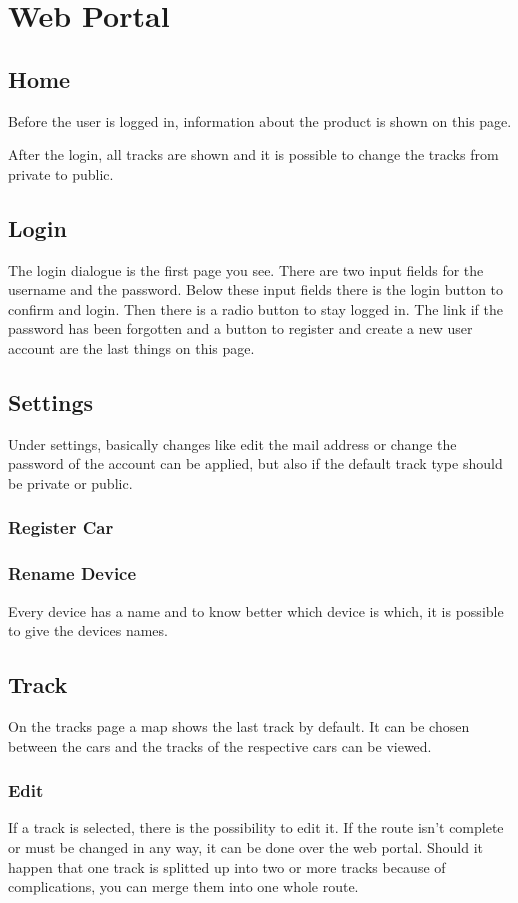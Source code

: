 \section{Web Portal}
\subsection{Home}
Before the user is logged in, information about the product is shown on this page.

After the login, all tracks are shown and it is possible to change the tracks from private to public.
\subsection{Login}
The login dialogue is the first page you see. There are two input fields for the username and the password. Below these input fields there is the login button to confirm and login. Then there is a radio button to stay logged in.
The link if the password has been forgotten and a button to register and create a new user account are the last things on this page.
\subsection{Settings}
Under settings, basically changes like edit the mail address or change the password of the account can be applied, but also if the default track type should be private or public.
\subsubsection{Register Car}

\subsubsection{Rename Device}
Every device has a name and to know better which device is which, it is possible to give the devices names.
\subsection{Track}
On the tracks page a map shows the last track by default. It can be chosen between the cars and the tracks of the respective cars can be viewed.
\subsubsection{Edit}
If a track is selected, there is the possibility to edit it. If the route isn’t complete or must be changed in any way, it can be done over the web portal. Should it happen that one track is splitted up into two or more tracks because of complications, you can merge them into one whole route.
